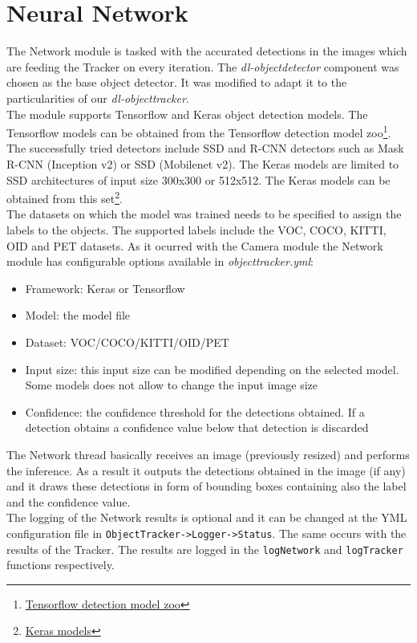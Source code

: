 \section{Neural Network} 
The Network module is tasked with the accurated detections in the images which are feeding the Tracker on every iteration. The \textit{dl-objectdetector} component was chosen as the base object detector. It was modified to adapt it to the particularities of our \textit{dl-objecttracker}.\\
The module supports Tensorflow and Keras object detection models. The Tensorflow models can be obtained from the Tensorflow detection model zoo\footnote{\href {https://github.com/tensorflow/models/blob/master/research/object_detection/g3doc/detection_model_zoo.md}{Tensorflow detection model zoo}}. The successfully tried detectors include SSD and R-CNN detectors such as Mask R-CNN (Inception v2) or SSD (Mobilenet v2). The Keras models are limited to SSD architectures of input size 300x300 or 512x512. The Keras models can be obtained from this set\footnote{\href {https://github.com/pierluigiferrari/ssd_keras#download-the-original-trained-model-weights}{Keras models}}.\\
The datasets on which the model was trained needs to be specified to assign the labels to the objects. The supported labels include the VOC, COCO, KITTI, OID and PET datasets. As it ocurred with the Camera module the Network module has configurable options available in \textit{objecttracker.yml}:
\begin{itemize}
    \item Framework: Keras or Tensorflow
    \item Model: the model file
    \item Dataset: VOC/COCO/KITTI/OID/PET
    \item Input size: this input size can be modified depending on the selected model. Some models does not allow to change the input image size
    \item Confidence: the confidence threshold for the detections obtained. If a detection obtains a confidence value below that detection is discarded
\end{itemize}
The Network thread basically receives an image (previously resized) and performs the inference. As a result it outputs the detections obtained in the image (if any) and it draws these detections in form of bounding boxes containing also the label and the confidence value.\\
The logging of the Network results is optional and it can be changed at the YML configuration file in \texttt{ObjectTracker->Logger->Status}. The same occurs with the results of the Tracker. The results are logged in the \texttt{logNetwork} and \texttt{logTracker} functions respectively.
